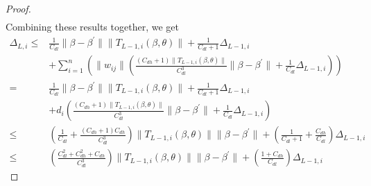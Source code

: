 \begin{proof}
\begin{align*}
\end{align*}
Combining these results together, we get
\begin{align*}
    \Delta_{L, i} 
    \leq& \frac{1}{C_{dl}}\|\beta - \beta^\prime\|\|T_{L-1, i}(\beta, \theta)\| + \frac{1}{C_{dl}+1}\Delta_{L-1, i} \\
    &+ \sum_{i=1}^n \left(\|w_{ij}\|\left(
    \frac{(C_{dh}+1)\|T_{L-1, i}(\beta, \theta)\|}{C_{dl}^3}
    \|\beta - \beta^\prime\| 
    + \frac{1}{C_{dl}}\Delta_{L-1,i}\right)\right)\\
    =& \frac{1}{C_{dl}}\|\beta - \beta^\prime\|\|T_{L-1, i}(\beta, \theta)\| + \frac{1}{C_{dl}+1}\Delta_{L-1, i} \\
    &+ d_i\left(
    \frac{(C_{dh}+1)\|T_{L-1, i}(\beta, \theta)\|}{C_{dl}^3}
    \|\beta - \beta^\prime\| + \frac{1}{C_{dl}}\Delta_{L-1,i}\right)\\
    \leq& \left(\frac{1}{C_{dl}}+ 
    \frac{(C_{dh}+1)C_{dh}}{C_{dl}^3}
    \right)\|T_{L-1, i}(\beta, \theta)\| \|\beta - \beta^\prime\| + \left(\frac{1}{C_{dl}+1} + \frac{C_{dh}}{C_{dl}}\right)\Delta_{L-1, i}\\
    \leq & \left(
    \frac{C_{dl}^2 + C_{dh}^2 + C_{dh}}{C_{dl}^3}
    \right)\|T_{L-1, i}(\beta, \theta)\| \|\beta - \beta^\prime\| + \left(\frac{1 + C_{dh}}{C_{dl}}\right)\Delta_{L-1, i}
\end{align*}
\end{proof}

